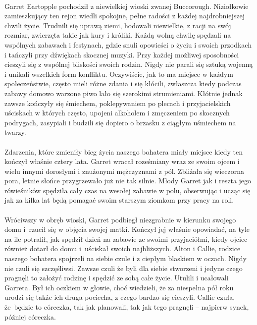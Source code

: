\documentclass[10pt,twoside,twocolumn]{book}
\begin{document}
\paragraph{}
Garret Eartopple pochodził z niewielkiej wioski zwanej Buccorough.
Niziołkowie zamieszkujący ten rejon wiedli spokojne, pełne radości z każdej najdrobniejszej chwili życie.
Trudnili się uprawą ziemi, hodowali niewielkie, z racji na swój rozmiar, zwierzęta takie jak kury i króliki.
Każdą wolną chwilę spędzali na wspólnych zabawach i festynach, gdzie snuli opowieści o życiu i swoich przodkach i tańczyli przy dźwiękach skocznej muzyki.
Przy każdej możliwej sposobności cieszyli się z wspólnej bliskości swoich rodzin.
Nigdy nie parali się sztuką wojenną i unikali wszelkich form konfliktu.
Oczywiście, jak to ma miejsce w każdym społeczeństwie, często mieli różne zdania i się kłócili, zwłaszcza kiedy podczas zabawy domowo warzone piwo lało się szerokimi strumieniami.
Kłótnie jednak zawsze kończyły się śmiechem, poklepywaniem po plecach i przyjacielskich uściskach w których często, upojeni alkoholem i zmęczeniem po skocznych podrygach, zasypiali i budzili się dopiero o brzasku z ciągłym uśmiechem na twarzy.

\paragraph{}
Zdarzenia, które zmieniły bieg życia naszego bohatera miały miejsce kiedy ten kończył właśnie cztery lata.
Garret wracał roześmiany wraz ze swoim ojcem i wielu innymi dorosłymi i znużonymi mężczyznami z pól.
Zbliżała się wieczorna pora, letnie słońce przygrzewało już nie tak silnie.
Młody Garret jak i reszta jego rówieśników spędziła cały czas na wesołej zabawie w polu, obserwując i ucząc się jak za kilka lat będą pomagać swoim starszym ziomkom przy pracy na roli.

\paragraph{}
Wróciwszy w obręb wioski, Garret podbiegł niezgrabnie w kierunku swojego domu i rzucił się w objęcia swojej matki.
Kończył jej właśnie opowiadać, na tyle na ile potrafił, jak spędził dzień na zabawie ze swoimi przyjaciółmi, kiedy ojciec również dotarł do domu i uściskał swoich najbliższych.
Alton i Callie, rodzice naszego bohatera spojrzeli na siebie czule i z ciepłym blaskiem w oczach.
Nigdy nie czuli się szczęśliwsi.
Zawsze czuli że byli dla siebie stworzeni i jedyne czego pragnęli to założyć rodzinę i spędzić ze sobą całe życie.
Utulili i ucałowali Garreta.
Był ich oczkiem w głowie, choć wiedzieli, że za niespełna pół roku urodzi się także ich druga pociecha, z czego bardzo się cieszyli.
Callie czuła, że będzie to córeczka, tak jak planowali, tak jak tego pragnęli – najpierw synek, później córeczka.
\end{document}
